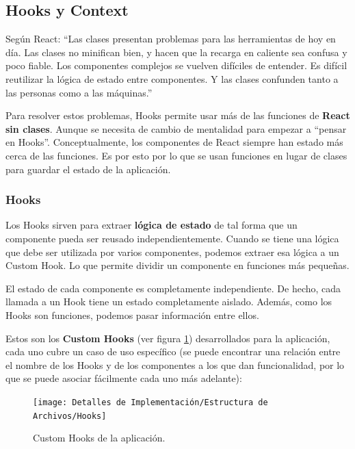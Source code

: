 \documentclass[12pt,twoside,titlepage]{report}
\begin{document}
\subsection{Hooks y Context}

Según React: ``Las clases presentan problemas para las herramientas de hoy en día. Las clases no minifican bien, y hacen que la recarga en caliente sea confusa y poco fiable. Los componentes complejos se vuelven difíciles de entender. Es difícil reutilizar la lógica de estado entre componentes. Y las clases confunden tanto a las personas como a las máquinas.'' \cite{reactHooks}

Para resolver estos problemas, Hooks permite usar más de las funciones de \textbf{React sin clases}. Aunque se necesita de cambio de mentalidad para empezar a “pensar en Hooks”. Conceptualmente, los componentes de React siempre han estado más cerca de las funciones. Es por esto por lo que se usan funciones en lugar de clases para guardar el estado de la aplicación.

\subsubsection{Hooks}

Los Hooks sirven para extraer \textbf{lógica de estado} de tal forma que un componente pueda ser reusado independientemente. Cuando se tiene una lógica que debe ser utilizada por varios componentes, podemos extraer esa lógica a un Custom Hook. Lo que permite dividir un componente en funciones más pequeñas.

El estado de cada componente es completamente independiente. De hecho, cada llamada a un Hook tiene un estado completamente aislado. Además, como los Hooks son funciones, podemos pasar información entre ellos.

Estos son los \textbf{Custom Hooks} (ver figura \ref{fig:Hooks}) desarrollados para la aplicación, cada uno cubre un caso de uso específico (se puede encontrar una relación entre el nombre de los Hooks y de los componentes a los que dan funcionalidad, por lo que se puede asociar fácilmente cada uno más adelante):

\begin{figure}[H]
    \centering
    \texttt{[image: Detalles de Implementación/Estructura de Archivos/Hooks]}
    \caption{Custom Hooks de la aplicación.}
    \label{fig:Hooks}
\end{figure}
\end{document}
